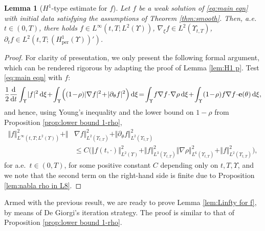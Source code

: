 \documentclass[11pt,a4paper,reqno]{amsart}
\newtheorem{lemma}[prop]{Lemma}
\theoremstyle{remark}
\theoremstyle{definition}
\numberwithin{equation}{section}
\newcommand{\per}{\mathrm{per}}
\newcommand{\e}{{\bf e}}
\newcommand{\bxi}{\xi}
\renewcommand{\d}{\, \mathrm{d} }
\newcommand{\der}{\mathrm{d}}
\begin{document}
\begin{lemma}[$H^1$-type estimate for $f$]\label{lem:H1 for f}
    Let $f$ be a weak solution of \eqref{eq:main eqn} with initial data satisfying the assumptions of Theorem \ref{thm:smooth}. Then, a.e.~$t \in (0,T)$, there holds $f \in L^\infty(t,T;L^2(\Upsilon))$, $\nabla_{\bxi} f \in L^2(\Upsilon_{t,T})$, $\partial_t f \in L^2(t,T;(H^1_\per(\Upsilon))')$.
\end{lemma}
\begin{proof}
 For clarity of presentation, we only present the following formal argument, which can be rendered rigorous by adapting the proof of Lemma \ref{lem:H1 p}. Test \eqref{eq:main eqn} with $f$: 
    \begin{equation*}
       \begin{aligned} \frac{1}{2}\frac{\der}{\der t}\int_\Upsilon\! |f|^2 \d \bxi\!+\! \int_\Upsilon\! \Big( (1\!-\!\rho) |\nabla f|^2 \!+\! |\partial_\theta f|^2 \Big) \d \bxi \!=\! \int_\Upsilon \! f\nabla f\! \cdot\! \nabla \rho \d \bxi \!+\! \int_\Upsilon (1\!-\!\rho)f \nabla f \!\cdot\! \e (\theta) \d \bxi, 
       \end{aligned}
    \end{equation*}
    and hence, using Young's inequality and the lower bound on $1-\rho$ from Proposition \ref{prop:lower bound 1-rho}, 
       \begin{equation*}
       \begin{aligned} \Vert f \Vert_{L^\infty(t,T;L^2(\Upsilon))}^2 + \Vert & \nabla f \Vert_{L^2(\Upsilon_{t,T})}^2 + \Vert\partial_\theta f\Vert_{L^2(\Upsilon_{t,T})}^2 \\ 
       &\leq C \Big(\Vert f(t,\cdot) \Vert_{L^2(\Upsilon)}^2 + \Vert f \Vert_{L^3(\Upsilon_{t,T})}^2 \Vert \nabla \rho \Vert_{L^6(\Upsilon_{t,T})}^2 + \Vert f \Vert_{L^2(\Upsilon_{t,T})}^2 \Big), 
       \end{aligned}
    \end{equation*}
   for a.e.~$t \in (0,T)$, for some positive constant $C$ depending only on $t,T,\Upsilon$, and we note that the second term on the right-hand side is finite due to Proposition \ref{lem:nabla rho in L8}. 
\end{proof}

Armed with the previous result, we are ready to prove Lemma \ref{lem:Linfty for f}, by means of De Giorgi's iteration strategy. The proof is similar to that of Proposition \ref{prop:lower bound 1-rho}. 
\end{document}

